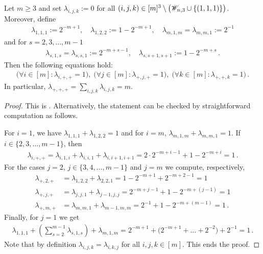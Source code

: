 \begin{lemma} \label{lem:Kravtsov}
	Let $m \geq 3$ and set $\lambda_{i,j,k} := 0$ for all $(i,j,k) \in [m]^3 \setminus \big(\mathscr{W}_{n,3}\cup \lbrace (1,1,1) \rbrace \big)$. Moreover, define
	\begin{align*}
		\lambda_{1,1,1} := 2^{-m+1}, \quad \lambda_{1,2,2} := 1- 2^{-m+1}, \quad \lambda_{m,1,m} = \lambda_{m,m,1} := 2^{-1}
	\end{align*}
	and for $s=2,3,\ldots,m-1$
	\begin{align*}
		\lambda_{s,1,s} = \lambda_{s,s,1} := 2^{-m+s-1} ,\quad \lambda_{s,s+1,s+1} := 1-2^{-m+s} \, .
	\end{align*}
	Then the following equations hold:
	\begin{align}
		\big( \forall i \in [m] \colon \lambda_{i,+,+} = 1 \big), \;
		\big( \forall j \in [m] \colon  \lambda_{+,j,+} = 1 \big), \;
		\big( \forall k \in [m] \colon \lambda_{+,+,k} = 1 \big) \, .\label{eq:marginals-krav}
	\end{align}
	In particular, $ \lambda_{+,+,+} = \sum_{i,j,k} \lambda_{i,j,k} = m$.
\end{lemma}

\begin{proof}
	This is \cite[Theorem 1 with $k=0$]{krav}. Alternatively, the statement can be checked by straightforward computation as follows.
	
	For $i=1$, we have $\lambda_{1,1,1} + \lambda_{1,2,2} =1$ and for $i=m$, $\lambda_{m,1,m} + \lambda_{m,m,1} = 1$. If $i \in \{2,3,\ldots,m-1\}$, then
	\begin{align*}
		\lambda_{i,+,+} = \lambda_{i,1,i} + \lambda_{i,i,1} + \lambda_{i,i+1,i+1} = 2\cdot2^{-m+i-1} + 1-2^{-m+i} = 1 \, .
	\end{align*}
	For the cases $j=2$, $j \in \{3,4,\ldots,m-1 \}$ and $j=m$ we compute, respectively,
	\begin{align*}
		\lambda_{+,2,+} &= \lambda_{1,2,2} + \lambda_{2,2,1} = 1-2^{-m+1} + 2^{-m+2-1} = 1 \\
		\lambda_{+,j,+} &= \lambda_{j,j,1} + \lambda_{j-1,j,j} = 2^{-m+j-1} + 1 - 2^{-m+(j-1)} = 1 \\
		\lambda_{+,m,+} &= \lambda_{m,m,1} + \lambda_{m-1,m,m} = 2^{-1} + 1 - 2^{-m+(m-1)} = 1 \, .
	\end{align*}
	Finally, for $j=1$ we get
	\begin{align*}
		\lambda_{1,1,1} + \left( \sum_{s=2}^{m-1} \lambda_{s,1,s} \right) + \lambda_{m,1,m}
		= 2^{-m+1} + \big( 2^{-m+1} + \ldots + 2^{-2} \big) + 2^{-1} = 1 \, .
	\end{align*}
	Note that by definition $\lambda_{i,j,k} = \lambda_{i,k,j}$ for all $i,j,k \in [m]$. This ends the proof.
\end{proof}

